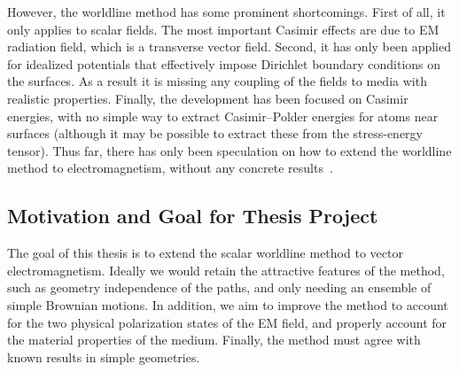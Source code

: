 
However, the worldline method has some prominent shortcomings.  First of all, it only applies 
to scalar fields.
  The most important Casimir effects are due to EM radiation field, 
which is a transverse vector field.
  Second, it has only been applied for idealized potentials that effectively impose 
Dirichlet boundary conditions on the surfaces.  As a result it is missing any 
coupling of the fields to media with realistic properties.
Finally, the development has been focused on Casimir energies, with no simple way to 
extract Casimir--Polder energies for atoms near surfaces 
(although it may be possible to extract these from the stress-energy tensor). 
Thus far, there has only been speculation on how to extend the worldline method to 
electromagnetism, without any concrete results~\citep{Aehlig2011}.  


\subsection{Motivation and Goal for Thesis Project}

The goal of this thesis is to extend the scalar worldline method to vector electromagnetism.
Ideally we would retain the attractive features of the method, such as geometry independence of the paths,
and only needing an ensemble of simple Brownian motions.
In addition, we aim to improve the method to account for the two physical polarization
states of the EM field, and properly account for the material properties of the medium.  
Finally, the method must agree with known results in simple geometries.  

